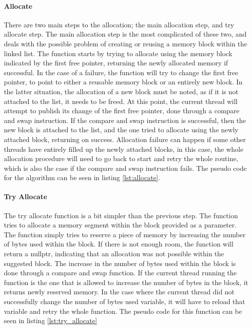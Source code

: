\paragraph{Allocate}
There are two main steps to the allocation; the main allocation step, and try allocate step.
The main allocation step is the most complicated of these two, and deals with the possible problem of creating or reusing a memory block within the linked list.
The function starts by trying to allocate using the memory block indicated by the first free pointer, returning the newly allocated memory if successful.
In the case of a failure, the function will try to change the first free pointer, to point to either a reusable memory block or an entirely new block.
In the latter situation, the allocation of a new block must be noted, as if it is not attached to the list, it needs to be freed.
At this point, the current thread will attempt to publish its change of the first free pointer, done through a compare and swap instruction.
If the compare and swap instruction is successful, then the new block is attached to the list, and the one tried to allocate using the newly attached block, returning on success.
Allocation failure can happen if some other threads have entirely filled up the newly attached blocks, in this case, the whole allocation procedure will need to go back to start and retry the whole routine, which is also the case if the compare and swap instruction fails.
The pseudo code for the algorithm can be seen in listing \ref{lst:allocate}.


\paragraph{Try Allocate}
The try allocate function is a bit simpler than the previous step. The function tries to allocate
a memory segment within the block provided as a parameter.
The function simply tries to reserve a piece of memory by increasing the number of bytes used within the block.
If there is not enough room, the function will return a nullptr, indicating that an allocation was not possible within the suggested block.
The increase in the number of bytes used within the block is done through a compare and swap function.
If the current thread running the function is the one that is allowed to increase the number of bytes in the block, it returns newly reserved memory.
In the case where the current thread did not successfully change the number of bytes used variable, it will have to reload that variable and retry the whole function.
The pseudo code for this function can be seen in listing \ref{lst:try_allocate}


